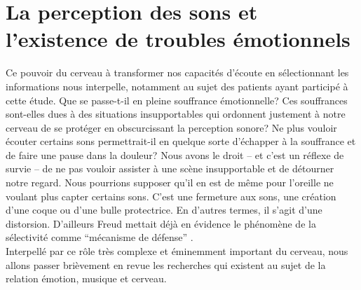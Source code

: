 \section{La perception des sons et l'existence de troubles
  émotionnels}
Ce pouvoir du cerveau à transformer nos capacités d'écoute en sélectionnant les informations nous 
interpelle, notamment au sujet des  patients ayant participé à cette étude.
Que se passe-t-il en pleine
souffrance émotionnelle? Ces souffrances sont-elles dues à des situations
insupportables qui
ordonnent justement à notre cerveau de se protéger en obscurcissant la
perception sonore?  Ne plus vouloir écouter certains
sons permettrait-il en quelque sorte d'échapper à la souffrance et de faire une
pause dans la douleur? Nous avons le droit -- et c'est un réflexe de
survie -- de ne pas vouloir assister à une scène insupportable et de détourner
notre regard.  Nous pourrions supposer qu'il en est de même pour l'oreille ne voulant plus capter
certains sons. C'est une fermeture aux sons, une création d'une coque ou d'une bulle protectrice. En 
d'autres termes, il s'agit d'une distorsion.
D'ailleurs Freud mettait déjà en évidence le phénomène de la sélectivité comme ``mécanisme de 
défense'' \autocite{ Freud}.
\\
Interpellé par ce rôle très complexe et éminemment important du cerveau, nous allons passer brièvement 
en revue les recherches qui existent  au sujet de la relation émotion, musique et cerveau. %
 


